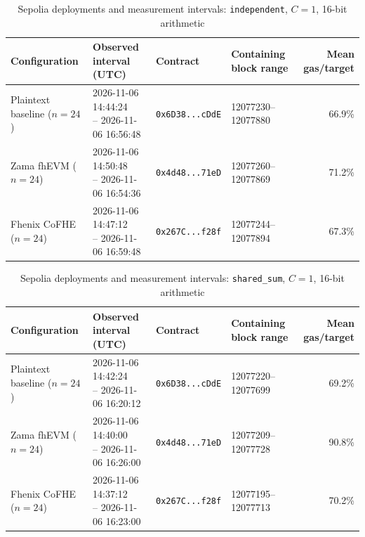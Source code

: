\begin{table}[!t]
\caption{Sepolia deployments and measurement intervals: \texttt{independent}, \(C=1\), 16-bit arithmetic}
\label{tab:sepolia-experiment-deployments-concurrency-euint16-concurrency-w16-c1-independent}
\centering
\footnotesize
\setlength{\tabcolsep}{4pt}
\begin{tabular}{|l|l|l|l|r|}
\hline
\textbf{Configuration} &
\textbf{Observed interval (UTC)} &
\textbf{Contract} &
\textbf{Containing block range} &
\textbf{Mean gas/target} \\
\hline
Plaintext baseline (\(n=24\)) &
\shortstack[l]{2026-11-06 14:44:24 \\ -- 2026-11-06 16:56:48} &
\texttt{0x6D38...cDdE} &
12077230--12077880 &
66.9\% \\
\hline
Zama fhEVM (\(n=24\)) &
\shortstack[l]{2026-11-06 14:50:48 \\ -- 2026-11-06 16:54:36} &
\texttt{0x4d48...71eD} &
12077260--12077869 &
71.2\% \\
\hline
Fhenix CoFHE (\(n=24\)) &
\shortstack[l]{2026-11-06 14:47:12 \\ -- 2026-11-06 16:59:48} &
\texttt{0x267C...f28f} &
12077244--12077894 &
67.3\% \\
\hline
\end{tabular}
\end{table}

\begin{table}[!t]
\caption{Sepolia deployments and measurement intervals: \texttt{shared\_sum}, \(C=1\), 16-bit arithmetic}
\label{tab:sepolia-experiment-deployments-concurrency-euint16-concurrency-w16-c1-shared-sum}
\centering
\footnotesize
\setlength{\tabcolsep}{4pt}
\begin{tabular}{|l|l|l|l|r|}
\hline
\textbf{Configuration} &
\textbf{Observed interval (UTC)} &
\textbf{Contract} &
\textbf{Containing block range} &
\textbf{Mean gas/target} \\
\hline
Plaintext baseline (\(n=24\)) &
\shortstack[l]{2026-11-06 14:42:24 \\ -- 2026-11-06 16:20:12} &
\texttt{0x6D38...cDdE} &
12077220--12077699 &
69.2\% \\
\hline
Zama fhEVM (\(n=24\)) &
\shortstack[l]{2026-11-06 14:40:00 \\ -- 2026-11-06 16:26:00} &
\texttt{0x4d48...71eD} &
12077209--12077728 &
90.8\% \\
\hline
Fhenix CoFHE (\(n=24\)) &
\shortstack[l]{2026-11-06 14:37:12 \\ -- 2026-11-06 16:23:00} &
\texttt{0x267C...f28f} &
12077195--12077713 &
70.2\% \\
\hline
\end{tabular}
\end{table}

